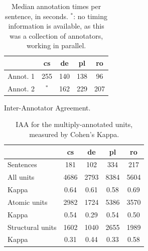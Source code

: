 \documentclass[11pt,letterpaper]{article}
\makeatletter
\renewcommand{\paragraph}{
  \@startsection{paragraph}{4}
  {\z@}{.1ex \@plus .1ex \@minus .1ex}{-1.5em}
  {\normalfont\normalsize\bfseries}
}
\newcommand{\XXX}[1]{{\color{red}XXX #1}} %
\newcommand{\oa}[1]{}
\makeatother
\begin{document}

\begin{table}[t]
\begin{center}
{\small
\begin{tabular}{l|cccc}
& cs & de & pl & ro \\
\hline
Annot. 1 & 255 & 140  & 138 & 96 \\
Annot. 2 & $^*$ & 162 & 229 & 207 \\
\end{tabular}
\caption{Median annotation times per sentence, in seconds.
  $^*$: no timing information is available, as
  this was a collection of annotators, working in parallel.}
\label{tab:annot_times}
}
\end{center}
\end{table}




\paragraph{Inter-Annotator Agreement.}
\label{sec:iaa}

\begin{table}[t]
\begin{center}
{\small
\begin{tabular}{l|cccc}
 & cs & de & pl & ro \\
\hline
Sentences & 181 & 102 & 334 & 217 \\
\hline
All units & 4686   & 2793   & 8384   & 5604  \\
Kappa & 0.64   & 0.61   & 0.58   & 0.69  \\
\hline
Atomic units & 2982 & 1724 & 5386 & 3570 \\
Kappa & 0.54 & 0.29 & 0.54 & 0.50 \\
\hline
Structural units & 1602 & 1040 & 2655 & 1989 \\
Kappa & 0.31 & 0.44 & 0.33 & 0.58 \\
\end{tabular}
\caption{IAA for the multiply-annotated units,
measured by Cohen's Kappa. }
\label{tab:iaa}
}
\end{center}
\end{table}

\end{document}
